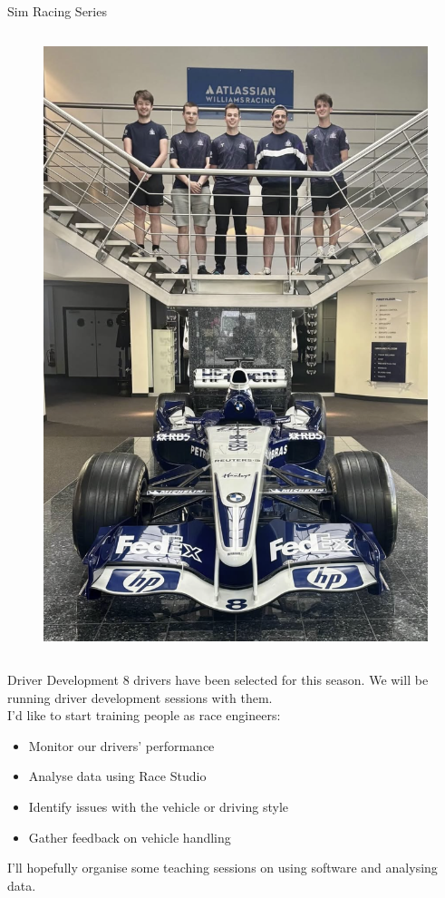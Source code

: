 \begin{frame}{Sim Racing Series}
\begin{columns}
\begin{figure}
            \includegraphics[width=\textwidth]{res/Williams Sim Racing.png}
        \end{figure}
    \end{columns}
\end{frame}

\begin{frame}{Driver Development}
    8 drivers have been selected for this season.
    We will be running driver development sessions with them. \\
    \vspace{2ex}
    I'd like to start training people as race engineers:
    \begin{itemize}
        \item Monitor our drivers' performance
        \item Analyse data using Race Studio
        \item Identify issues with the vehicle or driving style
        \item Gather feedback on vehicle handling
    \end{itemize}
    I'll hopefully organise some teaching sessions
    on using software and analysing data.
\end{frame}

